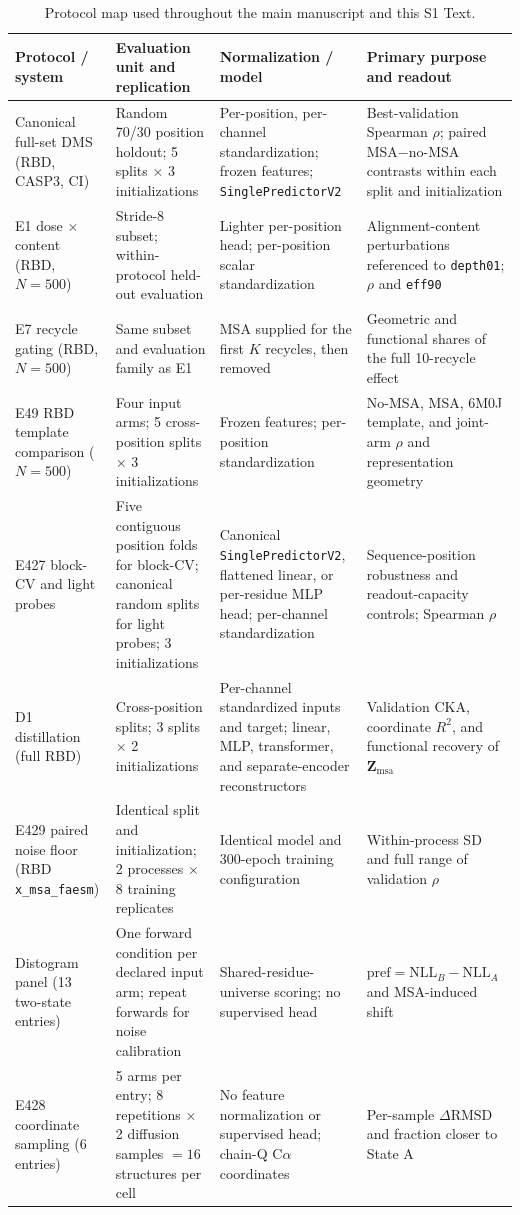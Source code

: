 \documentclass[10pt,a4paper]{article}
\newcommand{\Zmsa}{\mathbf{Z}_{\mathrm{msa}}}
\begin{document}
\begin{table}[!htbp]
\centering
\caption{Protocol map used throughout the main manuscript and this S1 Text.}
\label{tab:protocol_map}
\scriptsize
\begin{tabularx}{\textwidth}{l Y Y Y}
\toprule
\textbf{Protocol / system} & \textbf{Evaluation unit and replication} & \textbf{Normalization / model} & \textbf{Primary purpose and readout} \\
\midrule
Canonical full-set DMS (RBD, CASP3, CI) & Random 70/30 position holdout; 5 splits $\times$ 3 initializations & Per-position, per-channel standardization; frozen features; \texttt{SinglePredictorV2} & Best-validation Spearman $\rho$; paired MSA$-$no-MSA contrasts within each split and initialization \\
E1 dose $\times$ content (RBD, $N=500$) & Stride-8 subset; within-protocol held-out evaluation & Lighter per-position head; per-position scalar standardization & Alignment-content perturbations referenced to \texttt{depth01}; $\rho$ and \texttt{eff90} \\
E7 recycle gating (RBD, $N=500$) & Same subset and evaluation family as E1 & MSA supplied for the first $K$ recycles, then removed & Geometric and functional shares of the full 10-recycle effect \\
E49 RBD template comparison ($N=500$) & Four input arms; 5 cross-position splits $\times$ 3 initializations & Frozen features; per-position standardization & No-MSA, MSA, 6M0J template, and joint-arm $\rho$ and representation geometry \\
E427 block-CV and light probes & Five contiguous position folds for block-CV; canonical random splits for light probes; 3 initializations & Canonical \texttt{SinglePredictorV2}, flattened linear, or per-residue MLP head; per-channel standardization & Sequence-position robustness and readout-capacity controls; Spearman $\rho$ \\
D1 distillation (full RBD) & Cross-position splits; 3 splits $\times$ 2 initializations & Per-channel standardized inputs and target; linear, MLP, transformer, and separate-encoder reconstructors & Validation CKA, coordinate $R^2$, and functional recovery of $\Zmsa$ \\
E429 paired noise floor (RBD \texttt{x\_msa\_faesm}) & Identical split and initialization; 2 processes $\times$ 8 training replicates & Identical model and 300-epoch training configuration & Within-process SD and full range of validation $\rho$ \\
Distogram panel (13 two-state entries) & One forward condition per declared input arm; repeat forwards for noise calibration & Shared-residue-universe scoring; no supervised head & $\mathrm{pref}=\mathrm{NLL}_B-\mathrm{NLL}_A$ and MSA-induced shift \\
E428 coordinate sampling (6 entries) & 5 arms per entry; 8 repetitions $\times$ 2 diffusion samples $=16$ structures per cell & No feature normalization or supervised head; chain-Q C$\alpha$ coordinates & Per-sample $\Delta\mathrm{RMSD}$ and fraction closer to State A \\
\bottomrule
\end{tabularx}
\end{table}
\end{document}
